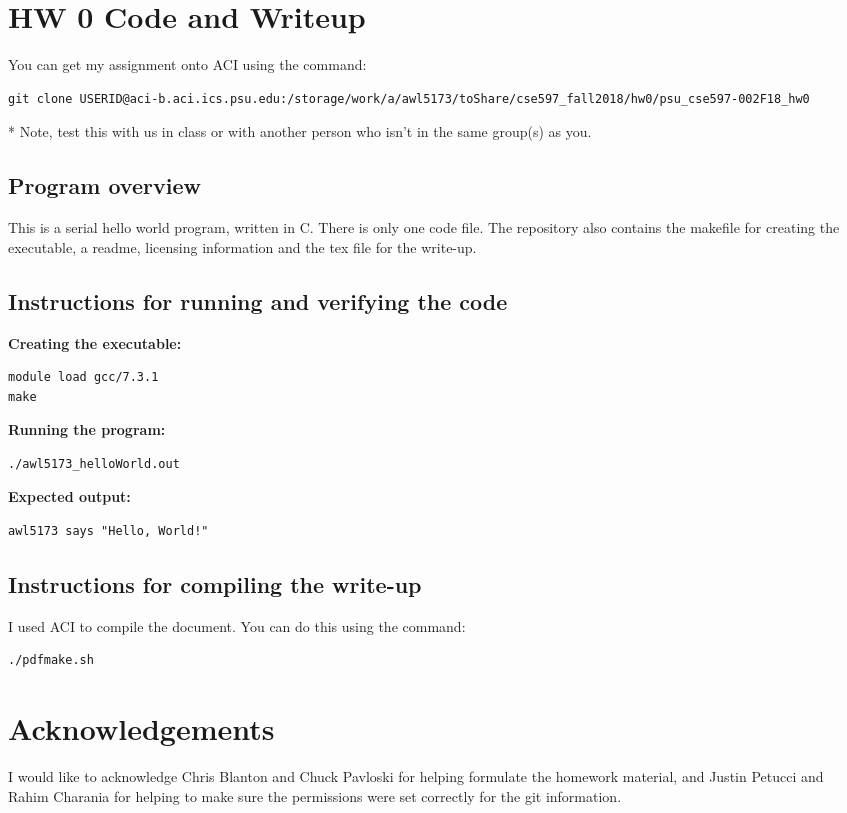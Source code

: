 \documentclass{article}
\begin{document}
\begin{spacing}{1.1}
\section{HW 0 Code and Writeup}

You can get my assignment onto ACI using the command:

\begin{verbatim}
git clone USERID@aci-b.aci.ics.psu.edu:/storage/work/a/awl5173/toShare/cse597_fall2018/hw0/psu_cse597-002F18_hw0
\end{verbatim}

* Note, test this with us in class or with another person who isn't in the same group(s) as you.

\subsection{Program overview}

This is a serial hello world program, written in C. There is only one code file. The repository also contains the makefile for creating the executable, a readme, licensing information and the tex file for the write-up.


\subsection{Instructions for running and verifying the code}

\textbf{Creating the executable:}
\begin{verbatim}
module load gcc/7.3.1
make
\end{verbatim}

\textbf{Running the program:}
\begin{verbatim}
./awl5173_helloWorld.out
\end{verbatim}

\textbf{Expected output:}
\begin{verbatim}
awl5173 says "Hello, World!"
\end{verbatim}

\subsection{Instructions for compiling the write-up}

I used ACI to compile the document.  You can do this using the command:
\begin{verbatim}
./pdfmake.sh
\end{verbatim}

\section{Acknowledgements}

I would like to acknowledge Chris Blanton and Chuck Pavloski for helping formulate the homework material, and Justin Petucci and Rahim Charania for helping to make sure the permissions were set correctly for the git information.




\end{spacing}
\end{document}
